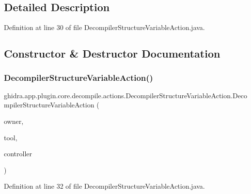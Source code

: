 \subsection{Detailed Description}


Definition at line 30 of file Decompiler\+Structure\+Variable\+Action.\+java.



\subsection{Constructor \& Destructor Documentation}
\mbox{\label{classghidra_1_1app_1_1plugin_1_1core_1_1decompile_1_1actions_1_1_decompiler_structure_variable_action_aa98508c7959991ab9acba25a4be9258a}} 
\subsubsection{\texorpdfstring{DecompilerStructureVariableAction()}{DecompilerStructureVariableAction()}}
{\footnotesize\ttfamily ghidra.\+app.\+plugin.\+core.\+decompile.\+actions.\+Decompiler\+Structure\+Variable\+Action.\+Decompiler\+Structure\+Variable\+Action (\begin{DoxyParamCaption}\item[{String}]{owner,  }\item[{Plugin\+Tool}]{tool,  }\item[{\mbox{\hyperlink{classghidra_1_1app_1_1decompiler_1_1component_1_1_decompiler_controller}{Decompiler\+Controller}}}]{controller }\end{DoxyParamCaption})\hspace{0.3cm}{\ttfamily [inline]}}



Definition at line 32 of file Decompiler\+Structure\+Variable\+Action.\+java.



